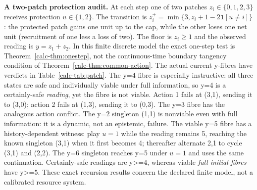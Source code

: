 \documentclass[10pt,twocolumn]{article}
\theoremstyle{definition}
\begin{document}
\textbf{A two-patch protection audit.} At each step one of two
patches \(z_i\in\{0,1,2,3\}\) receives protection \(u\in\{1,2\}\).
The transition is \(z_i^+=\min\{3,z_i+1-2\mathbf 1[u\ne i]\}\):
the protected patch gains one unit up to the cap, while the other
loses one net unit (recruitment of one less a loss of two).
The floor is \(z_i\ge1\) and the observed reading is
\(y=z_1+z_2\). In this finite discrete model the exact one-step
test is Theorem~\ref{calc-thm:onestep}, not the continuous-time boundary
tangency condition of Theorem~\ref{calc-thm:common-action}.
The actual current y-fibres have verdicts in
Table~\ref{calc-tab:patch}. The y=4 fibre is especially instructive:
all three states are safe and individually viable under full
information, so y=4 is a certainly-safe \emph{reading}, yet the fibre
is not viable. Action 1 fails at (3,1), sending it to (3,0);
action 2 fails at (1,3), sending it to (0,3). The y=3 fibre
has the analogous action conflict. The y=2 singleton (1,1) is
nonviable even with full information: it is a dynamic, not an epistemic,
failure. The viable y=5 fibre has a history-dependent witness: play
\(u=1\) while the reading remains 5, reaching the known singleton (3,1)
when it first becomes 4; thereafter alternate 2,1 to cycle (3,1)
and (2,2). The y=6 singleton reaches y=5 under \(u=1\) and uses the same
continuation. Certainly-safe readings are y>=4, whereas viable
\emph{full initial fibres} have y>=5. These exact recursion results
concern the declared finite model, not a calibrated resource system.

\begin{table}[t]
\centering
{}
\caption{The five actual safe-state fibres of the aggregate reading
\(y=z_1+z_2\). The one-step discrete obstruction is
Theorem~\ref{calc-thm:onestep}; the y=2 singleton fails even with full
information. The y=4 reading certifies current safety but cannot
support one common safe action. The viable rows admit the stated
history-dependent policies.}
\label{calc-tab:patch}
\end{table}
\end{document}
